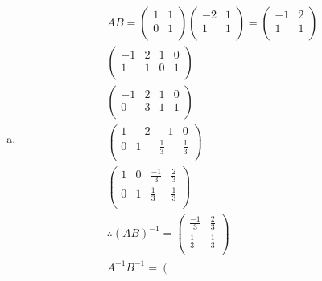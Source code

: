 \documentclass{standalone}
\begin{document}
\begin{enumerate}[a)]
\item
    \begin{align*}
        AB = \left(\begin{array}{rr}
        1 & 1 \\
        0 & 1 \\
        \end{array}\right)\left(\begin{array}{rr}
        -2 & 1 \\
        1 & 1 \\
        \end{array}\right) = \left(\begin{array}{rr}
        -1 & 2 \\
        1 & 1 \\
        \end{array}\right) \\
        \left(\begin{array}{rr|rr}
        -1 & 2 & 1 & 0 \\
        1 & 1 & 0 & 1 \\
        \end{array}\right) \\
        \left(\begin{array}{rr|rr}
        -1 & 2 & 1 & 0 \\
        0 & 3 & 1 & 1 \\
        \end{array}\right) \\
        \left(\begin{array}{rr|rr}
        1 & -2 & -1 & 0 \\
        0 & 1 & \frac{1}{3} & \frac{1}{3} \\
        \end{array}\right) \\
        \left(\begin{array}{rr|rr}
        1 & 0 & \frac{-1}{3} & \frac{2}{3} \\
        0 & 1 & \frac{1}{3} & \frac{1}{3} \\
        \end{array}\right) \\
        \therefore (AB)^{-1} = \left(\begin{array}{rr}
        \frac{-1}{3} & \frac{2}{3} \\
        \frac{1}{3} & \frac{1}{3} \\
        \end{array}\right) \\
        A^{-1}B^{-1} = \left(\begin{array}{rr}

\end{array}
\end{align*}
\end{enumerate}
\end{document}
